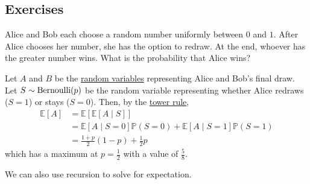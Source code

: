 \subsection{Exercises}

	\begin{exercise}
	  \label{ex:fair-coin-toss-game}
		Alice and Bob each choose a random number uniformly between $0$ and $1$. After Alice chooses her number, she has the option to redraw. At the end, whoever has the greater number wins. What is the probability that Alice wins? 
	\end{exercise}
	\begin{solution}
		Let $A$ and $B$ be the \hyperref[def:random-variable]{random variables} representing Alice and Bob's final draw. Let $S \sim \operatorname{Bernoulli}(p)$ be the random variable representing whether Alice redraws ($S = 1$) or stays ($S = 0$). Then, by the \hyperref[thm:tower-rule]{tower rule}, 
		\begin{align}
			\mathbb{E}[A] & = \mathbb{E}[\mathbb{E}[A \mid S]] \\ 
										& = \mathbb{E}[A \mid S = 0] \mathbb{P}(S = 0) + \mathbb{E}[A \mid S = 1] \mathbb{P}(S = 1) \\ 
										& = \frac{1 + p}{2} (1 - p) + \frac{1}{2} p
		\end{align}
		which has a maximum at $p = \frac{1}{2}$ with a value of $\frac{5}{8}$. 
	\end{solution}

	We can also use recursion to solve for expectation. 


